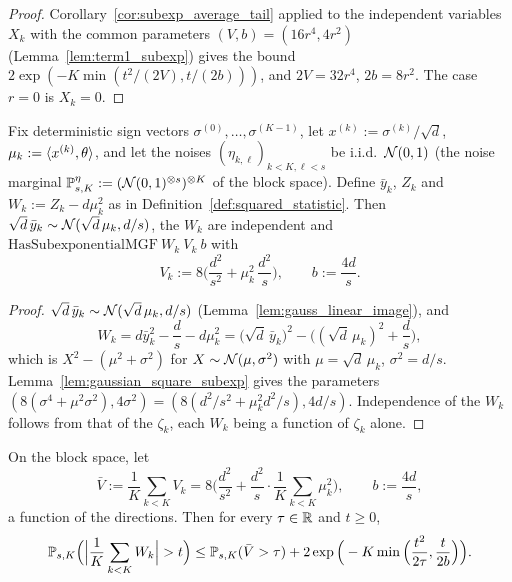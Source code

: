 \begin{proof}
\leanok
{}
Corollary~\ref{cor:subexp_average_tail} applied to the independent variables $X_k$ with the
common parameters $(V, b) = (16r^4, 4r^2)$ (Lemma~\ref{lem:term1_subexp}) gives the bound
$2\exp(-K\min(t^2/(2V), t/(2b)))$, and $2V = 32r^4$, $2b = 8r^2$. The case $r = 0$ is
$X_k = 0$.
\end{proof}

\begin{lemma}\label{lem:term2_conditional}
\leanok
{}
Fix deterministic sign vectors $\sigma^{(0)}, \dots, \sigma^{(K-1)}$, let
$x^{(k)} := \sigma^{(k)}/\sqrt d$, $\mu_k := \langle x^{(k)}, \theta \rangle$, and let the noises
$(\eta_{k,\ell})_{k<K,\ell<s}$ be i.i.d.\ $\mathcal{N}(0,1)$ (the noise marginal
$\mathbb{P}^{\eta}_{s,K} := (\mathcal{N}(0,1)^{\otimes s})^{\otimes K}$ of the block space). Define
$\bar y_k$, $Z_k$ and $W_k := Z_k - d\mu_k^2$ as in Definition~\ref{def:squared_statistic}.
Then $\sqrt d\,\bar y_k \sim \mathcal{N}(\sqrt d\,\mu_k, d/s)$, the $W_k$ are independent and
$\mathrm{HasSubexponentialMGF}\ W_k\ V_k\ b$ with
\[
  V_k := 8\Big( \frac{d^2}{s^2} + \mu_k^2\,\frac{d^2}{s} \Big), \qquad b := \frac{4d}{s} .
\]
\end{lemma}

\begin{proof}
\leanok
{}
$\sqrt d\,\bar y_k \sim \mathcal{N}(\sqrt d\,\mu_k, d/s)$ (Lemma~\ref{lem:gauss_linear_image}),
and
\[
  W_k = d\bar y_k^2 - \frac ds - d\mu_k^2
      = \big(\sqrt d\,\bar y_k\big)^2 - \Big( (\sqrt d\,\mu_k)^2 + \frac ds \Big),
\]
which is $X^2 - (\mu^2 + \sigma^2)$ for $X \sim \mathcal{N}(\mu,\sigma^2)$ with
$\mu = \sqrt d\,\mu_k$, $\sigma^2 = d/s$. Lemma~\ref{lem:gaussian_square_subexp} gives the
parameters $(8(\sigma^4 + \mu^2\sigma^2), 4\sigma^2) = (8(d^2/s^2 + \mu_k^2 d^2/s), 4d/s)$.
Independence of the $W_k$ follows from that of the $\zeta_k$, each $W_k$ being a function
of $\zeta_k$ alone.
\end{proof}

\begin{lemma}\label{lem:term2_bound}
\leanok
{}
On the block space, let
\[
  \bar V := \frac1K\sum_{k<K} V_k
  = 8\Big( \frac{d^2}{s^2} + \frac{d^2}{s}\cdot\frac1K\sum_{k<K}\mu_k^2 \Big),
  \qquad b := \frac{4d}{s} ,
\]
a function of the directions. Then for every $\tau \in \mathbb{R}$ and $t \ge 0$,
\[
  \mathbb{P}_{s,K}\Big( \Big| \frac1K\sum_{k<K} W_k \Big| > t \Big)
  \le \mathbb{P}_{s,K}(\bar V > \tau)
    + 2\exp\Big( -K\min\Big( \frac{t^2}{2\tau}, \frac{t}{2b} \Big) \Big).
\]
\end{lemma}

